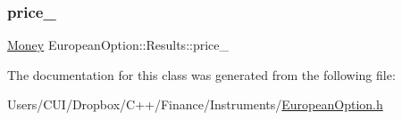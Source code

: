 \hypertarget{class_european_option_1_1_results_a517b87143fda866b135b21051dc4fd6c}{}\label{class_european_option_1_1_results_a517b87143fda866b135b21051dc4fd6c} 
\subsubsection{\texorpdfstring{price\+\_\+}{price\_}}
{\footnotesize\ttfamily \hyperlink{_name_def_8h_a5a9d48c16a694e9a2d9f1eca730dc8c5}{Money} European\+Option\+::\+Results\+::price\+\_\+}



The documentation for this class was generated from the following file\+:\begin{DoxyCompactItemize}
\item 
Users/\+C\+U\+I/\+Dropbox/\+C++/\+Finance/\+Instruments/\hyperlink{_european_option_8h}{European\+Option.\+h}\end{DoxyCompactItemize}
